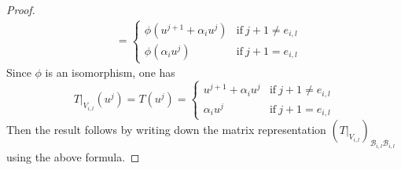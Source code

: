 \documentclass[12pt]{amsbook}
\newtheorem{corollary}[theorem]{Corollary}
\begin{document}
\begin{proof}
\begin{align*}
&= \begin{cases} \phi(u^{j+1} + \alpha_i u^j) & \text{if}\ j+1 \neq e_{i,l} \\
\phi( \alpha_i u^j) & \text{if}\ j+1 = e_{i,l} \end{cases} 
\end{align*}
Since $\phi$ is an isomorphism, one has
$$ T|_{V_{i,l}}(u^j) = T(u^j) = \begin{cases} u^{j+1} + \alpha_i u^j & \text{if}\ j+1 \neq e_{i,l} \\
\alpha_i u^j & \text{if}\ j+1 = e_{i,l} \end{cases} $$
Then the result follows by writing down the matrix representation $(T|_{V_{i,l}})_{\mathcal{B}_{i,l}\mathcal{B}_{i,l}}$ using the above formula.
\end{proof}

\end{document}

